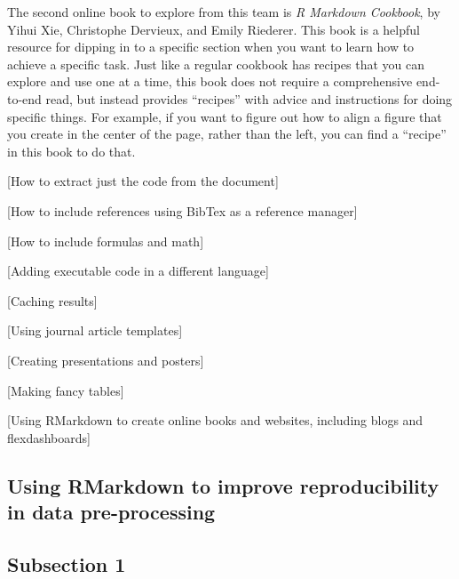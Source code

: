 \documentclass[]{tufte-book}
\begin{document}
The second online book to explore from this team is \emph{R Markdown Cookbook},
by Yihui Xie, Christophe Dervieux, and Emily Riederer. This book is a helpful
resource for dipping in to a specific section when you want to learn how to
achieve a specific task. Just like a regular cookbook has recipes that you can
explore and use one at a time, this book does not require a comprehensive
end-to-end read, but instead provides ``recipes'' with advice and instructions
for doing specific things. For example, if you want to figure out how to
align a figure that you create in the center of the page, rather than the
left, you can find a ``recipe'' in this book to do that.

{[}How to extract just the code from the document{]}

{[}How to include references using BibTex as a reference manager{]}

{[}How to include formulas and math{]}

{[}Adding executable code in a different language{]}

{[}Caching results{]}

{[}Using journal article templates{]}

{[}Creating presentations and posters{]}

{[}Making fancy tables{]}

{[}Using RMarkdown to create online books and websites, including blogs and
flexdashboards{]}

\hypertarget{using-rmarkdown-to-improve-reproducibility-in-data-pre-processing}{%
\subsection{Using RMarkdown to improve reproducibility in data pre-processing}\label{using-rmarkdown-to-improve-reproducibility-in-data-pre-processing}}

\hypertarget{subsection-1}{%
\subsection{Subsection 1}\label{subsection-1}}
\end{document}
